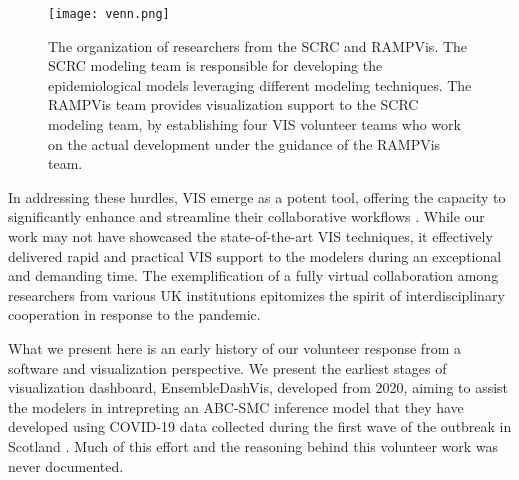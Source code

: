 \begin{figure}[tb!]
    \centering
    \texttt{[image: venn.png]}
    \caption{The organization of researchers from the SCRC and RAMPVis. The SCRC modeling team is responsible for developing the epidemiological models leveraging different modeling techniques. The RAMPVis team provides visualization support to the SCRC modeling team, by establishing four VIS volunteer teams who work on the actual development under the guidance of the RAMPVis team.
    }
    \label{fig:venn}

\end{figure}

In addressing these hurdles, \ac{VIS} emerge as a potent tool, offering the capacity to significantly enhance and streamline their collaborative workflows \cite{swallow2022Challenges}.
While our work may not have showcased the state-of-the-art VIS techniques, it effectively delivered rapid and practical VIS support to the modelers during an exceptional and demanding time.
The exemplification of a fully virtual collaboration among researchers from various UK institutions epitomizes the spirit of interdisciplinary cooperation in response to the pandemic.

What we present here is an early history of our volunteer response from a software and visualization perspective. We present the earliest stages of visualization dashboard, EnsembleDashVis, developed from 2020, aiming to assist the modelers in intrepreting an \ac{ABC-SMC} inference model that they have developed using COVID-19 data collected during the first wave of the outbreak in Scotland \cite{2020Covid19}. Much of this effort and the reasoning behind this volunteer work was never documented.
